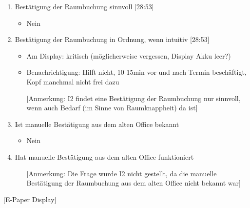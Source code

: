 \begin{enumerate}
    \item Bestätigung der Raumbuchung sinnvoll [28:53]
     \begin{itemize}
        \item Nein
    \end{itemize}
    
    \item Bestätigung der Raumbuchung in Ordnung, wenn intuitiv [28:53]
     \begin{itemize}
        \item Am Display: kritisch (möglicherweise vergessen, Display Akku leer?)
        \item Benachrichtigung: Hilft nicht, 10-15min vor und nach Termin beschäftigt, Kopf manchmal nicht frei dazu
        \item[] [Anmerkung: I2 findet eine Bestätigung der Raumbuchung nur sinnvoll, wenn auch Bedarf (im Sinne von Raumknappheit) da ist]
    \end{itemize}
    
    \item Ist manuelle Bestätigung aus dem alten Office bekannt
     \begin{itemize}
        \item Nein
    \end{itemize}
    
    \item Hat manuelle Bestätigung aus dem alten Office funktioniert
     \begin{itemize}
        \item[] [Anmerkung: Die Frage wurde I2 nicht gestellt, da die manuelle Bestätigung der Raumbuchung aus dem alten Office nicht bekannt war] 
    \end{itemize}

\end{enumerate}

[E-Paper Display]

